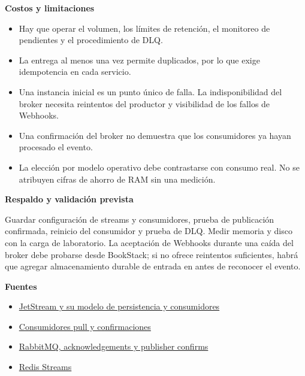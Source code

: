 \par\medskip\noindent\textbf{Costos y limitaciones}\par\nobreak\smallskip

\begin{itemize}[leftmargin=1.5em,itemsep=3pt]
\item Hay que operar el volumen, los límites de retención, el monitoreo de pendientes y el procedimiento de DLQ.
\item La entrega al menos una vez permite duplicados, por lo que exige idempotencia en cada servicio.
\item Una instancia inicial es un punto único de falla. La indisponibilidad del broker necesita reintentos del productor y visibilidad de los fallos de Webhooks.
\item Una confirmación del broker no demuestra que los consumidores ya hayan procesado el evento.
\item La elección por modelo operativo debe contrastarse con consumo real. No se atribuyen cifras de ahorro de RAM sin una medición.
\end{itemize}

\par\medskip\noindent\textbf{Respaldo y validación prevista}\par\nobreak\smallskip

Guardar configuración de streams y consumidores, prueba de publicación confirmada, reinicio del consumidor y prueba de DLQ. Medir memoria y disco con la carga de laboratorio. La aceptación de Webhooks durante una caída del broker debe probarse desde BookStack; si no ofrece reintentos suficientes, habrá que agregar almacenamiento durable de entrada en  antes de reconocer el evento.

\par\medskip\noindent\textbf{Fuentes}\par\nobreak\smallskip

\begin{itemize}[leftmargin=1.5em,itemsep=3pt]
\item \href{https://docs.nats.io/concepts/jetstream}{JetStream y su modelo de persistencia y consumidores}
\item \href{https://docs.nats.io/learn/jetstream/pull-consumers}{Consumidores pull y confirmaciones}
\item \href{https://www.rabbitmq.com/docs/confirms}{RabbitMQ, acknowledgements y publisher confirms}
\item \href{https://redis.io/docs/latest/develop/data-types/streams/}{Redis Streams}
\end{itemize}

